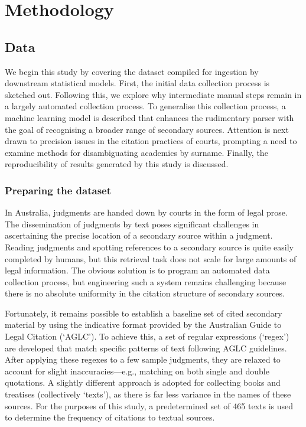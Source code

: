 \let\xn\xnote
\section{Methodology}


\subsection{Data}

We begin this study by covering the dataset compiled for ingestion by downstream statistical models. First, the initial data collection process is sketched out. Following this, we explore why intermediate manual steps remain in a largely automated collection process. To generalise this collection process, a machine learning model is described that enhances the rudimentary parser with the goal of recognising a broader range of secondary sources. Attention is next drawn to precision issues in the citation practices of courts, prompting a need to examine methods for disambiguating academics by surname. Finally, the reproducibility of results generated by this study is discussed.

\subsubsection{Preparing the dataset}

In Australia, judgments are handed down by courts in the form of legal prose.\xn{3-1} The dissemination of judgments by text poses significant challenges in ascertaining the precise location of a secondary source within a judgment. Reading judgments and spotting references to a secondary source is quite easily completed by humans,\xn{3-2} but this retrieval task does not scale for large amounts of legal information. The obvious solution is to program an automated data collection process, but engineering such a system remains challenging because there is no absolute uniformity in the citation structure of secondary sources.\xn{3-3} 

Fortunately, it remains possible to establish a baseline set of cited secondary material by using the indicative format provided by the Australian Guide to Legal Citation (`AGLC').\xn{3-4} To achieve this, a set of regular expressions (`regex') are developed that match specific patterns of text following AGLC guidelines.\xn{3-5} After applying these regexes to a few sample judgments, they are relaxed to account for slight inaccuracies---e.g., matching on both single and double quotations. A slightly different approach is adopted for collecting books and treatises (collectively `texts'), as there is far less variance in the names of these sources. For the purposes of this study, a predetermined set of 465 texts is used to determine the frequency of citations to textual sources.\xn{3-6}

